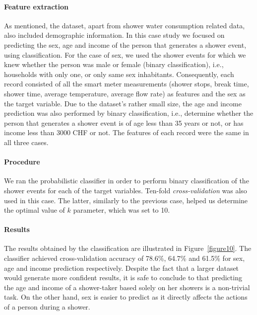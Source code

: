 \paragraph{Feature extraction}
\label{par:feat_extr2}
As mentioned, the dataset, apart from shower water consumption related data, also included demographic information. In this case study we focused on predicting the sex, age and income of the person that generates a shower event, using classification. For the case of sex, we used the shower events for which we knew whether the person was male or female (binary classification), i.e., households with only one, or only same sex inhabitants. Consequently, each record consisted of all the smart meter measurements (shower stops, break time, shower time, average temperature, average flow rate) as features and the sex as the target variable. Due to the dataset's rather small size, the age and income prediction was also performed by binary classification, i.e., determine whether the person that generates a shower event is of age less than 35 years or not, or has income less than 3000 CHF or not. The features of each record were the same in all three cases.

\paragraph{Procedure}
\label{par:procedure2}
We ran the probabilistic classifier in order to perform binary classification of the shower events for each of the target variables. Ten-fold \textit{cross-validation} was also used in this case. The latter, similarly to the previous case, helped us determine the optimal value of $k$ parameter, which was set to 10.

\paragraph{Results}
\label{par:res2}
The results obtained by the classification are illustrated in Figure~\ref{figure10}. The classifier achieved cross-validation accuracy of 78.6\%, 64.7\% and 61.5\% for sex, age and income prediction respectively. Despite the fact that a larger dataset would generate more confident results, it is safe to conclude to that predicting the age and income of a shower-taker based solely on her showers is a non-trivial task. On the other hand, sex is easier to predict as it directly affects the actions of a person during a shower.

